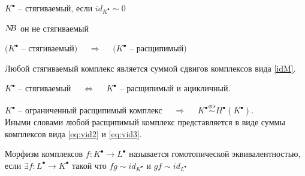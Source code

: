 \documentclass[../main.tex]{subfiles}
\begin{document}
\begin{to_def}
$K^\bullet$ -- стягиваемый, если $id_{K^\bullet}\sim 0$
\end{to_def}
\begin{to_ex}\label{idM}
\be
\label{eq:vid2}
\ee
\end{to_ex}
\begin{to_ex}
\be
\label{eq:vid3}
\ee
$N\kern-0.3em B$ он не стягиваемый
\end{to_ex}
\begin{to_suj}
$(K^\bullet$ -- стягиваемый$)$ $\quad \Rightarrow \quad$ $(K^\bullet$ -- расщипимый$)$
\bee
{}
\eee
\end{to_suj}
\begin{to_suj}
Любой стягиваемый комплекс является суммой сдвигов комплексов вида \ref{idM}. 
\end{to_suj}
\begin{to_suj}
$K^\bullet$ -- стягиваемый $\quad \Leftrightarrow \quad$ $K^\bullet$ -- расщипимый и ацикличный.
\end{to_suj}
\begin{to_suj}
$K^\bullet$ -- ограниченный расщипимый комплекс $\quad \Rightarrow \quad$ $K^\bullet\overset{qis}{\sim}H^\bullet(K^\bullet)$. \\
Иными словами любой расщипимый комплекс представляется в виде суммы комплексов вида \ref{eq:vid2} и \ref{eq:vid3}.
\end{to_suj}
\begin{to_def}
    Морфизм комплексов $f\colon K^\bullet \to L^\bullet$ называется гомотопической эквивалентностью, если $\exists f\colon L^\bullet \to K^\bullet$ такой что $fg \sim id_{K^\bullet}$ и $gf\sim id_{L^\bullet}$
\end{to_def}
\end{document}
